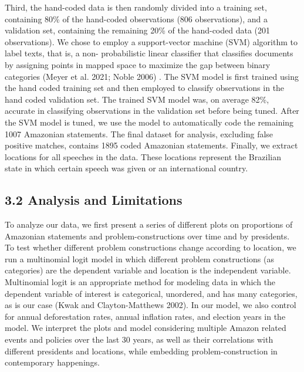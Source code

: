 \documentclass[
]{article}
\begin{document}
Third, the hand-coded data is then randomly divided into a training set,
containing 80\% of the hand-coded observations (806 observations), and a
validation set, containing the remaining 20\% of the hand-coded data
(201 observations). We chose to employ a support-vector machine (SVM)
algorithm to label texts, that is, a non- probabilistic linear
classifier that classifies documents by assigning points in mapped space
to maximize the gap between binary categories (Meyer et al. 2021; Noble
2006) . The SVM model is first trained using the hand coded training set
and then employed to classify observations in the hand coded validation
set. The trained SVM model was, on average 82\%, accurate in classifying
observations in the validation set before being tuned. After the SVM
model is tuned, we use the model to automatically code the remaining
1007 Amazonian statements. The final dataset for analysis, excluding
false positive matches, contains 1895 coded Amazonian statements.
Finally, we extract locations for all speeches in the data. These
locations represent the Brazilian state in which certain speech was
given or an international country.

\hypertarget{analysis-and-limitations}{%
\subsection{3.2 Analysis and
Limitations}\label{analysis-and-limitations}}

To analyze our data, we first present a series of different plots on
proportions of Amazonian statements and problem-constructions over time
and by presidents. To test whether different problem constructions
change according to location, we run a multinomial logit model in which
different problem constructions (as categories) are the dependent
variable and location is the independent variable. Multinomial logit is
an appropriate method for modeling data in which the dependent variable
of interest is categorical, unordered, and has many categories, as is
our case (Kwak and Clayton-Matthews 2002). In our model, we also control
for annual deforestation rates, annual inflation rates, and election
years in the model. We interpret the plots and model considering
multiple Amazon related events and policies over the last 30 years, as
well as their correlations with different presidents and locations,
while embedding problem-construction in contemporary happenings.
\end{document}
